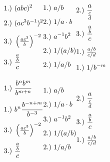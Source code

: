 \documentclass[12pt]{article}
\newcommand{\hs}{\hspace{1pt}} %
\begin{document}
\vspace{15pt}
\(
	\begin{aligned} 
		1.)\ & (abc)^2\\[5pt]
		2.)\ & (ac^{3}b^{-1})^2\\[5pt]
		3.)\ & \left( \tfrac{ac^3}{b} \right)^{-2} \\[5pt]
		3.)\ & \frac{ \frac{a}{b} }{ c } \\[5pt]
	\end{aligned}
	\hfill
	\begin{aligned} 
		1.)\ & a / b\\[5pt]
		2.)\ & 1 / a \cdot b \\[5pt]
		3.)\ & a^{-1}b^2 \\[5pt]
		2.)\ & 1 / (a / b) \\[5pt]
		2.)\ & 1 / a / b \\[5pt]
	\end{aligned}
	\hfill
	\begin{aligned} 
		2.)\ & \frac{a}{ \frac{c}{d} } \\[5pt]
		3.)\ & \frac{ \frac{a}{b} }{ c } \\[5pt]
		1.)\ & \tfrac{ a/b }{ c/d } \\[5pt]
		1.)\ & 1 / b^{-m}
	\end{aligned}
	\hfill \hs
\)

\vspace{15pt}
\(
	\begin{aligned} 
		1.)\ & \frac{b^n b^m}{b^{m+n}}\\[5pt]
		1.)\ & b^n \frac{ b^{-n+m} }{b^{-3}}\\[5pt]
		3.)\ & \left( \tfrac{ac^3}{b} \right)^{-2} \\[5pt]
		3.)\ & \frac{ \frac{a}{b} }{ c } \\[5pt]
	\end{aligned}
	\hfill
	\begin{aligned} 
		1.)\ & a / b\\[5pt]
		2.)\ & 1 / a \cdot b \\[5pt]
		3.)\ & a^{-1}b^2 \\[5pt]
		2.)\ & 1 / (a / b) \\[5pt]
		2.)\ & 1 / a / b \\[5pt]
	\end{aligned}
	\hfill
	\begin{aligned} 
		2.)\ & \frac{a}{ \frac{c}{d} } \\[5pt]
		3.)\ & \frac{ \frac{a}{b} }{ c } \\[5pt]
		1.)\ & \tfrac{ a/b }{ c/d } \\[5pt]
	\end{aligned}
	\hfill \hs
\)
\end{document}
